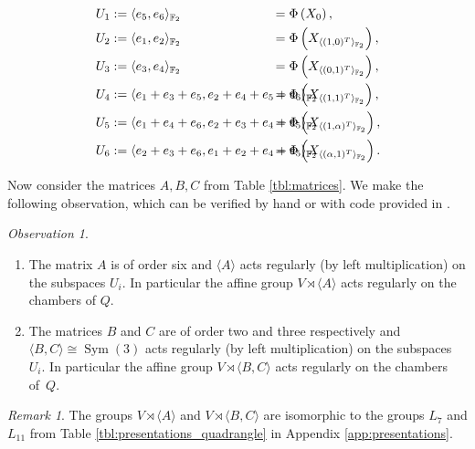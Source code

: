 \documentclass[dvipsnames]{article}
\theoremstyle{definition}
\theoremstyle{remark}
\newtheorem{observation}[theorem]{Observation}
\newtheorem{remark}[theorem]{Remark}
\DeclareMathOperator{\Sym}{Sym}
\DeclareMathOperator{\FF}{\mathbb F}
\begin{document}
    \begin{align*}
        U_1 &:= \langle e_5, e_6 \rangle_{\FF_2} && \hspace{-1.6cm}= \Phi \left(X_0\right) ,
        \\
        U_2 &:= \langle e_1, e_2 \rangle_{\FF_2} && \hspace{-1.6cm}= \Phi\left(X_{\langle(1,0)^T\rangle_{\FF_2}}\right) ,
        \\
        U_3 &:= \langle e_3, e_4 \rangle_{\FF_2} &&\hspace{-1.6cm}= \Phi\left(X_{\langle(0,1)^T\rangle_{\FF_2}}\right) ,
        \\
        U_4 &:= \langle e_1 + e_3 + e_5, e_2 + e_4 + e_5 + e_6\rangle_{\FF_2} &&\hspace{-1.6cm}= \Phi\left(X_{\langle(1,1)^T\rangle_{\FF_2}}\right) ,
        \\
        U_5 &:= \langle e_1 + e_4 + e_6, e_2 + e_3 + e_4 + e_5 \rangle_{\FF_2} &&\hspace{-1.6cm}= \Phi\left(X_{\langle(1,\alpha)^T\rangle_{\FF_2}}\right) ,
        \\
        U_6 &:= \langle e_2 + e_3 + e_6, e_1+e_2+e_4+e_5 \rangle_{\FF_2} &&\hspace{-1.6cm}= \Phi\left(X_{\langle(\alpha,1)^T\rangle_{\FF_2}}\right) .
        \end{align*}
        
    Now consider the matrices $A,B,C$ from Table \ref{tbl:matrices}. We make the following observation, which can be verified by hand or with code provided in \cite{ChamberRegularCode}.
    
    \begin{observation}
        \begin{enumerate}
            \item The matrix $A$ is of order six and $\langle A \rangle$ acts regularly (by left multiplication) on the subspaces $U_i$. In particular the affine group $V \rtimes \langle A \rangle$ acts regularly on the chambers of $Q$.
            \item The matrices $B$ and $C$ are of order two and three respectively and $\langle B,C \rangle \cong \Sym(3)$ acts regularly (by left multiplication) on the subspaces $U_i$. In particular the affine group $V \rtimes \langle B,C \rangle$ acts regularly on the chambers of~$Q$.
        \end{enumerate}
    \end{observation}

    \begin{remark}
        The groups $V \rtimes \langle A \rangle$ and $V \rtimes \langle B,C \rangle$ are isomorphic to the groups $L_7$ and $L_{11}$ from Table \ref{tbl:presentations_quadrangle} in Appendix \ref{app:presentations}.
    \end{remark}
    
\end{document}
